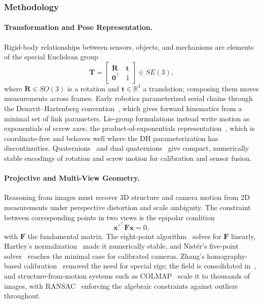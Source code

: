 \subsubsection{Methodology}

\paragraph{Transformation and Pose Representation.}
Rigid-body relationships between sensors, objects, and mechanisms are elements of the special Euclidean group
\begin{equation}
\mathbf{T} =
\begin{bmatrix}
\mathbf{R} & \mathbf{t} \\
\mathbf{0}^\top & 1
\end{bmatrix} \in SE(3),
\end{equation}
where $\mathbf{R} \in SO(3)$ is a rotation and $\mathbf{t} \in \mathbb{R}^3$ a translation; composing them moves measurements across frames. Early robotics parameterized serial chains through the Denavit--Hartenberg convention~\cite{Denavit1955Kinematic,Paul1981Robot}, which gives forward kinematics from a minimal set of link parameters. Lie-group formulations instead write motion as exponentials of screw axes, the product-of-exponentials representation~\cite{Murray1994RoboticManipulation,Lynch2017ModernRobotics}, which is coordinate-free and behaves well where the DH parameterization has discontinuities. Quaternions~\cite{Shoemake1985QuaternionCurves,Horn1987Orientation} and dual quaternions~\cite{Daniilidis1999DualQuat,horn2021online} give compact, numerically stable encodings of rotation and screw motion for calibration and sensor fusion.

\paragraph{Projective and Multi-View Geometry.}
Reasoning from images must recover 3D structure and camera motion from 2D measurements under perspective distortion and scale ambiguity. The constraint between corresponding points in two views is the epipolar condition
\begin{equation}
\mathbf{x}'^\top \mathbf{F} \mathbf{x} = 0,
\end{equation}
with $\mathbf{F}$ the fundamental matrix. The eight-point algorithm~\cite{LonguetHiggins1981Scene} solves for $\mathbf{F}$ linearly, Hartley's normalization~\cite{Hartley1997EightPoint} made it numerically stable, and Nistér's five-point solver~\cite{Nister2004FivePoint} reaches the minimal case for calibrated cameras. Zhang's homography-based calibration~\cite{zhang2000flexible} removed the need for special rigs; the field is consolidated in~\cite{hartley2003multiple}, and structure-from-motion systems such as COLMAP~\cite{schonberger2016structure} scale it to thousands of images, with RANSAC~\cite{Fischler1981RANSAC} enforcing the algebraic constraints against outliers throughout.

